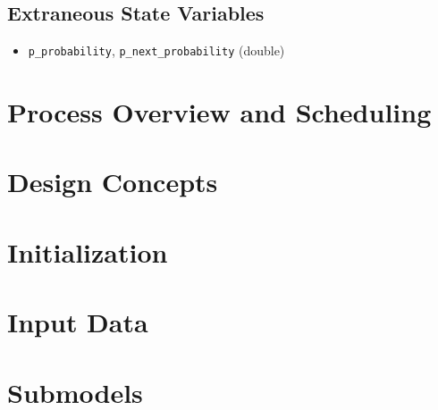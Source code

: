 \documentclass{article}
\begin{document}
\subsection{Extraneous State Variables}
\begin{itemize}
\item \texttt{p\_probability}, \texttt{p\_next\_probability} (double) \\


\end{itemize}

\section{Process Overview and Scheduling}

\section{Design Concepts}

 \section{Initialization}

\section{Input Data}

\section{Submodels}
\end{document}
